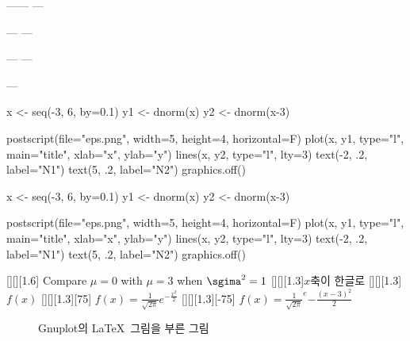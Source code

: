 \documentclass[11pt]{article}
\begin{document}
\begin{center}
------
---\begin{turn}{30}
\end{turn}---
---\begin{rotate}{30}
\end{rotate}---
---\begin{sideways}
\end{sideways}---
\end{center}

x <- seq(-3, 6, by=0.1)
y1 <- dnorm(x)
y2 <- dnorm(x-3)

postscript(file="eps.png", width=5, height=4, horizontal=F)
plot(x, y1, type="l", main="title", xlab="x", ylab="y")
lines(x, y2, type="l", lty=3)
text(-2, .2, label="N1")
text(5, .2, label="N2")
graphics.off()

x <- seq(-3, 6, by=0.1)
y1 <- dnorm(x)
y2 <- dnorm(x-3)

postscript(file="eps.png", width=5, height=4, horizontal=F)
plot(x, y1, type="l", main="title", xlab="x", ylab="y")
lines(x, y2, type="l", lty=3)
text(-2, .2, label="N1")
text(5, .2, label="N2")
graphics.off()

[][][1.6]
{Compare $\mu=0$ with $\mu=3$ when $\sgima^2=1$}
[][][1.3]{$x$축이 한글로}
[][][1.3]{$f(x)$}
[][][1.3][75]
{$f(x)=\frac{1}{\sqrt{2\pi}}e^{-\frac{x^2}{2}}$}
[][][1.3][-75]
{$f(x)=\frac{1}{\sqrt{2\pi}}^e{-\frac{(x-3)^2}{2}}$}

\begin{figure}
\begin{center}

\end{center}
\caption{Gnuplot의 \LaTeX\ 그림을 부른 그림 \label{fig:Gnuplot}}
\end{figure}
\end{document}
